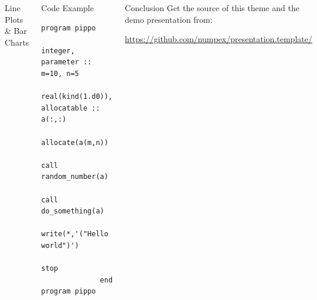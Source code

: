 \documentclass[final]{beamer}
\begin{document}
\begin{frame}[t,fragile]{}
\begin{center}
\begin{minipage}{0.9\paperwidth}
\begin{columns}[t,totalwidth=\textwidth]
\begin{block}{Line Plots \& Bar Charts}
          \end{block}
          
          \vspace{0.5cm}
          
          \begin{exampleblock}{Code Example}
            \begin{lstlisting}[basicstyle=\tt\scriptsize, showlines=true]
              program pippo
                integer, parameter :: m=10, n=5
                real(kind(1.d0)), allocatable :: a(:,:)
                allocate(a(m,n))
                call random_number(a)
                call do_something(a)
                write(*,'("Hello world")')
                stop
              end program pippo
                          \end{lstlisting}
          \end{exampleblock}

          \begin{block}{Conclusion}
            Get the source of this theme and the demo presentation from:
            \begin{center}\small
              \url{https://github.com/numpex/presentation.template/}
            \end{center}
          \end{block}
          
      \end{columns}
    \end{minipage}
  \end{center}
\end{frame}
\end{document}
